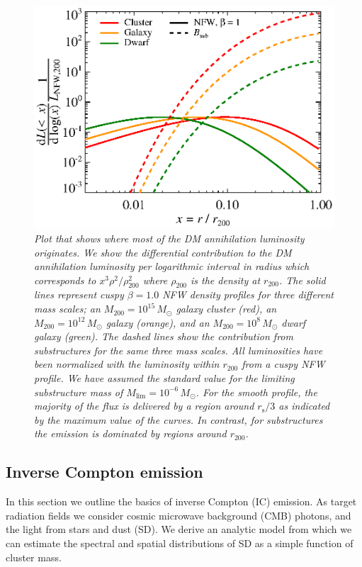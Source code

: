 \documentclass[10pt,aps,pra,reprint,amsmath,amsfonts,amssymb,showpacs,nofootinbib,floatfix]{revtex4-1}
\newcommand{\rmn}{\mathrm}
\newcommand{\msun}{M_\odot}
\newcommand{\s}{\rmn{s}}
\newcommand{\rvir}{r_{200}}
\newcommand{\mvir}{M_{200}}
\begin{document}
\begin{figure}
  \includegraphics[width=0.99\columnwidth]{figures/emissiv.sub.eps}
  \caption{\it Plot that shows where most of the DM annihilation
    luminosity originates.  We show the differential contribution to
    the DM annihilation luminosity per logarithmic interval in radius
    which corresponds to $x^3\rho^2/\rho^2_{200}$ where $\rho_{200}$
    is the density at $\rvir$. The solid lines represent cuspy
    $\beta=1.0$ NFW density profiles for three different mass scales;
    an $\mvir=10^{15}\,\msun$ galaxy cluster (red), an
    $\mvir=10^{12}\,\msun$ galaxy (orange), and an
    $\mvir=10^{8}\,\msun$ dwarf galaxy (green). The dashed lines show
    the contribution from substructures for the same three mass
    scales. All luminosities have been normalized with the luminosity
    within $\rvir$ from a cuspy NFW profile. We have assumed the
    standard value for the limiting substructure mass of
    $M_\rmn{lim}=10^{-6}\,\msun$. For the smooth profile, the majority
    of the flux is delivered by a region around $r_\s/3$ as indicated
    by the maximum value of the curves. In contrast, for substructures
    the emission is dominated by regions around $r_{200}$.}
  \label{fig:radial_emis}
\end{figure}


\subsection{Inverse Compton emission}
\label{sect:IC}

In this section we outline the basics of inverse Compton (IC)
emission. As target radiation fields we consider  cosmic microwave
background (CMB) photons, and the light from stars and dust (SD). We
derive an analytic model from which we can estimate the spectral
and spatial distributions of SD as a simple function of cluster mass.
\end{document}

